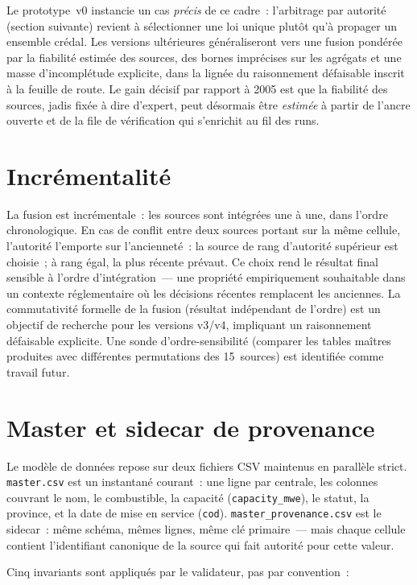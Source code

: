 \documentclass[a4paper,11pt]{report}
\begin{document}
Le prototype~v0 instancie un cas \emph{précis} de ce cadre~: l'arbitrage par autorité (section suivante) revient à sélectionner une loi unique plutôt qu'à propager un ensemble crédal. Les versions ultérieures généraliseront vers une fusion pondérée par la fiabilité estimée des sources, des bornes imprécises sur les agrégats et une masse d'incomplétude explicite, dans la lignée du raisonnement défaisable inscrit à la feuille de route. Le gain décisif par rapport à 2005 est que la fiabilité des sources, jadis fixée à dire d'expert, peut désormais être \emph{estimée} à partir de l'ancre ouverte et de la file de vérification qui s'enrichit au fil des runs.

\section{Incrémentalité}

La fusion est incrémentale~: les sources sont intégrées une à une, dans l'ordre chronologique. En cas de conflit entre deux sources portant sur la même cellule, l'autorité l'emporte sur l'ancienneté~: la source de rang d'autorité supérieur est choisie~; à rang égal, la plus récente prévaut. Ce choix rend le résultat final sensible à l'ordre d'intégration~--- une propriété empiriquement souhaitable dans un contexte réglementaire où les décisions récentes remplacent les anciennes. La commutativité formelle de la fusion (résultat indépendant de l'ordre) est un objectif de recherche pour les versions v3/v4, impliquant un raisonnement défaisable explicite. Une sonde d'ordre-sensibilité (comparer les tables maîtres produites avec différentes permutations des 15~sources) est identifiée comme travail futur.

\section{Master et sidecar de provenance}

Le modèle de données repose sur deux fichiers CSV maintenus en parallèle strict. \texttt{master.csv} est un instantané courant~: une ligne par centrale, les colonnes couvrant le nom, le combustible, la capacité (\texttt{capacity\_mwe}), le statut, la province, et la date de mise en service (\texttt{cod}). \texttt{master\_provenance.csv} est le sidecar~: même schéma, mêmes lignes, même clé primaire~--- mais chaque cellule contient l'identifiant canonique de la source qui fait autorité pour cette valeur.

Cinq invariants sont appliqués par le validateur, pas par convention~:
\end{document}
